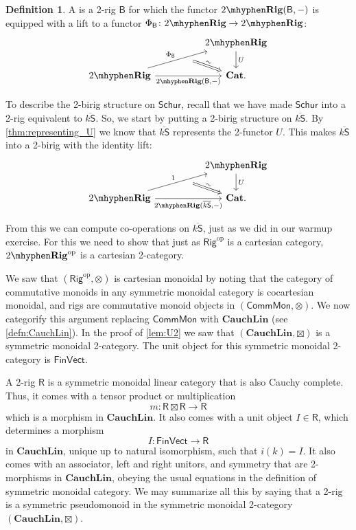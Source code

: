 \documentclass[12pt,reqno]{amsart}
\theoremstyle{plain}
\theoremstyle{definition}
\newtheorem{defn}[thm]{Definition}
\theoremstyle{remark}
\newcommand{\define}[1]{{\bf \boldmath{#1}}\index{#1}}
\newcommand{\maps}{\colon}
\newcommand{\op}{^\mathrm{op}}
\newcommand{\category}[1]{\mathsf{#1}}
\newcommand{\B}{\category B}
\newcommand{\R}{\category R}
\renewcommand{\S}{\category S}
\newcommand{\namedcat}[1]{\mathsf{#1}}
\newcommand{\Comm}{\namedcat{Comm}}
\newcommand{\Mon}{\namedcat{Mon}}
\newcommand{\Rig}{\namedcat{Rig}}
\newcommand{\Schur}{\namedcat{Schur}}
\newcommand{\TRig}{2\mhyphen\namedbicat{Rig}}
\newcommand{\Vect}{\namedcat{Vect}}
\newcommand{\Fin}{\namedcat{Fin}}
\newcommand{\namedbicat}[1]{\mathbf{#1}}
\newcommand{\CCat}{\namedbicat{Cat}}
\newcommand{\Lin}{\namedbicat{Lin}}
\newcommand{\Cauch}{\namedbicat{Cauch}}
\newcommand{\ksbar}{\overline{k\S}}
\numberwithin{thm}{section}
\begin{document}
\begin{defn} 
    A \define{2-birig} is a 2-rig $\B$ for which the functor $\TRig(\B, -)$ is equipped with a lift to a functor $\Phi_\B \maps \TRig \to \TRig$:
    \[
    \begin{tikzcd}[column sep = huge]
        &
        \TRig
        \arrow[d, "U"]
        \\
        \TRig
        \arrow[ur, "\Phi_\B"]
        \arrow[ur, swap, ""{name = phi}, phantom, bend right = 5, pos = 0.6]
        \arrow[r, swap, "{\TRig(\B, -)}"]
        \arrow[from = phi, r, Rightarrow, "\sim", sloped]
        &
        \CCat.
    \end{tikzcd}
    \] 
\end{defn}

To describe the 2-birig structure on $\Schur$, recall that we have made $\Schur$ into a 2-rig equivalent to $\ksbar$. So, we start by putting a 2-birig structure on $\ksbar$. By \cref{thm:representing_U} we know that $\ksbar$ represents the 2-functor $U$. This makes $\ksbar$ into a 2-birig with the identity lift:
\[
\begin{tikzcd}[column sep = huge]
    &
    \TRig
    \arrow[d, "U"]
    \\
    \TRig
    \arrow[ur, "1"]
    \arrow[ur, swap, ""{name = phi}, phantom, bend right = 5, pos = 0.6]
    \arrow[r, swap, "{\TRig(\ksbar, -)}"]
    \arrow[from = phi, r, Rightarrow, "\sim", sloped]
    &
    \CCat.
\end{tikzcd}
\] 

From this we can compute co-operations on $\ksbar$, just as we did in our warmup exercise. For this we need to show that just as $\Rig\op$ is a cartesian category, $\TRig\op$ is a cartesian 2-category.

We saw that $(\Rig\op, \otimes)$ is cartesian monoidal by noting that the category of commutative monoids in any symmetric monoidal category is cocartesian monoidal, and
rigs are commutative monoid objects in $(\Comm\Mon, \otimes)$. We now categorify this argument replacing $\Comm\Mon$ with $\Cauch\Lin$ (see \cref{defn:CauchLin}). In the proof of \cref{lem:U2} we saw that $(\Cauch\Lin, \boxtimes)$ is a symmetric monoidal 2-category. The unit object for this symmetric monoidal 2-category is $\Fin\Vect$.

A 2-rig $\R$ is a symmetric monoidal linear category that is also Cauchy complete. Thus, it comes with a tensor product or multiplication
\[ 
    m \maps \R \boxtimes \R \to \R
\]
which is a morphism in $\Cauch\Lin$. It also comes with a unit object $I \in \R$, which determines a morphism 
\[    
    I \maps \Fin\Vect \to \R  
\]
in $\Cauch\Lin$, unique up to natural isomorphism, such that $i(k) = I$. It also comes with an associator, left and right unitors, and symmetry that are 2-morphisms in $\Cauch\Lin$, obeying the usual equations in the definition of symmetric monoidal category. We may summarize all this by saying that a 2-rig is a symmetric pseudomonoid in the symmetric monoidal 2-category $(\Cauch\Lin, \boxtimes)$. 
 
\end{document}
